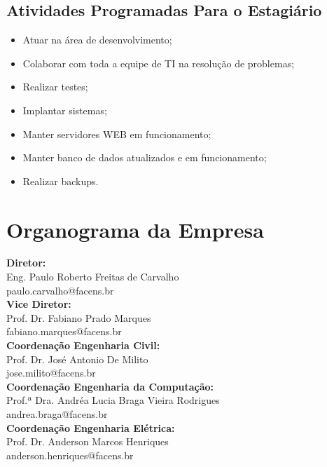 \documentclass[
	12pt,				%
	oneside,			%
	a4paper,			%
	chapter=TITLE,		%
	section=TITLE,		%
	sumario=tradicional %
	english,			%
	french,				%
	spanish,			%
	brazil				%
	]{abntex2}
\begin{document}
\section{Atividades Programadas Para o Estagiário}
\label{sec:ativestagiario}
\begin{itemize}
   \item Atuar na área de desenvolvimento;
   \item Colaborar com toda a equipe de TI na resolução de problemas;
   \item Realizar testes;
   \item Implantar sistemas;
   \item Manter servidores WEB em funcionamento;
   \item Manter banco de dados atualizados e em funcionamento;
   \item Realizar backups.
 \end{itemize}

\chapter{Organograma da Empresa}
\label{chap:chap3}
\textbf{Diretor:} \\ \indent Eng. Paulo Roberto Freitas de Carvalho \\
\indent paulo.carvalho@facens.br \\

\textbf{Vice Diretor:} \\ \indent  Prof. Dr. Fabiano Prado Marques \\
\indent fabiano.marques@facens.br \\

\textbf{Coordenação Engenharia Civil:}\\ \indent  Prof. Dr. José Antonio De Milito \\
\indent jose.milito@facens.br \\

\textbf{Coordenação Engenharia da Computação:}\\ \indent Prof.ª Dra. Andréa Lucia Braga Vieira Rodrigues \\
\indent andrea.braga@facens.br \\

\textbf{Coordenação Engenharia Elétrica:} \\ \indent Prof. Dr. Anderson Marcos Henriques \\
\indent anderson.henriques@facens.br \\
\end{document}
